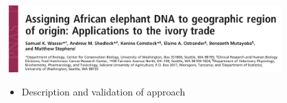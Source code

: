 \documentclass[10pt]{beamer}
\begin{document}
\begin{frame}[t]
\vspace{0.5cm}
	
	\includegraphics[width=0.8\textwidth]{figures/wasser1.png}
	
	\vspace{0.5cm}
	
	\begin{itemize}
		\item Description and validation of approach
	\end{itemize}
\end{frame}
\end{document}
